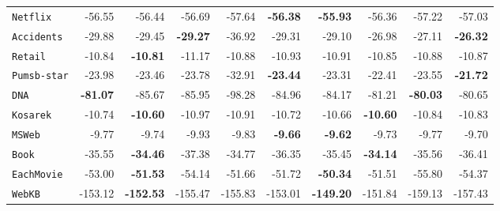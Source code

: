 \documentclass[xcolor={usenames,dvipsnames,svgnames}, compress]{beamer}
\begin{document}
\begin{frame}[t]
\begin{table}[t]
\begin{tabular}{l r r r r  r  r r r r}
    \texttt{Netflix}    & -56.55                               & -56.44                                & -56.69                 & -57.64  & \textbf{-56.38}  & \textbf{-55.93}  & -56.36         & -57.22          & -57.03          \\ 
    \texttt{Accidents}  & -29.88                               & -29.45                                & \textbf{-29.27}                 & -36.92  & -29.31  & -29.10           & -26.98         & -27.11          & \textbf{-26.32} \\ 
    \texttt{Retail}     & -10.84                               & \textbf{-10.81}                                & -11.17                 & -10.88  & -10.93  & -10.91           & -10.85         & -10.88          & -10.87          \\ 
    \texttt{Pumsb-star} & -23.98                               & -23.46                                & -23.78                 & -32.91  & \textbf{-23.44}  & -23.31           & -22.41         & -23.55          & \textbf{-21.72} \\ 
    \texttt{DNA}        &\textbf{-81.07}                               & -85.67                                & -85.95                 & -98.28  & -84.96  & -84.17           & -81.21         & \textbf{-80.03} & -80.65          \\ 
    \texttt{Kosarek}    & -10.74                               & \textbf{-10.60}                                & -10.97                 & -10.91  & -10.72  & -10.66           & \textbf{-10.60}         & -10.84          & -10.83          \\ 
    \texttt{MSWeb}      & -9.77                                & -9.74                                 & -9.93                  & -9.83   & \textbf{-9.66}   & \textbf{-9.62}   & -9.73          & -9.77           & -9.70           \\ 
    \texttt{Book}       & -35.55                               & \textbf{-34.46}                                & -37.38                 & -34.77  & -36.35  & -35.45           & \textbf{-34.14}         & -35.56          & -36.41          \\ 
    \texttt{EachMovie}  & -53.00                               & \textbf{-51.53}                                & -54.14                 & -51.66  & -51.72  & \textbf{-50.34}  & -51.51         & -55.80          & -54.37          \\ 
    \texttt{WebKB}      & -153.12                              & \textbf{-152.53}                               & -155.47                & -155.83 & -153.01 & \textbf{-149.20} & -151.84        & -159.13         & -157.43         \\ 

\end{tabular}
\end{table}
\end{frame}
\end{document}
